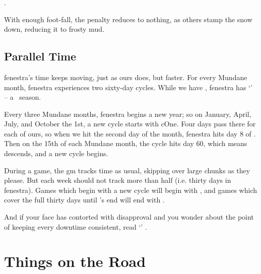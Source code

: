 \begin{multicols}{2}
\subsubsection{}
.

With enough foot-fall, the penalty reduces to nothing, as others stamp the snow down, reducing it to frosty mud.


\subsection{Parallel Time}

\Gls{fenestra}'s time keeps moving, just as ours does, but faster.
For every Mundane month, \gls{fenestra} experiences two sixty-day \glspl{cycle}.
\setcounter{track}{\month}
\setCycle{\month}{\day}
While we have \trackMonth, \gls{fenestra} has `\showCycle' -- a \showTemperature\ season.

Every three Mundane months, \gls{fenestra} begins a new year; so on January, April, July, and October the 1st, a new \gls{cycle} starts with \gls{cOne}.
Four days pass there for each of ours, so when we hit the second day of the month, \gls{fenestra} hits day 8 of .
Then on the 15th of each Mundane month, the \gls{cycle} hits day 60, which means  descends, and a new \gls{cycle} begins.

During a game, the \gls{gm} tracks time as usual, skipping over large chunks as they please.
But each week should not track more than half  (i.e. thirty days in \gls{fenestra}).
Games which begin with a new \gls{cycle} will begin with , and games which cover the full thirty days until 's end will end with .

And if your face has contorted with disapproval and you wonder about the point of keeping every \gls{downtime} consistent, read `' .

\end{multicols}

\section{Things on the Road}
\label{randomEncounters}

